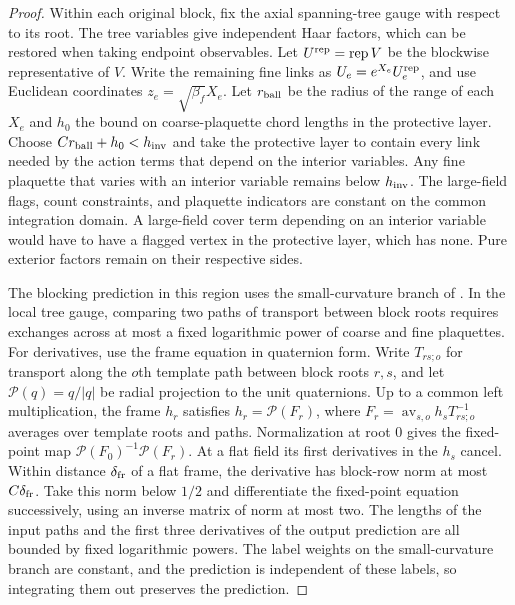 \documentclass[11pt,a4paper]{article}
\numberwithin{equation}{section}
\begin{document}
\begin{proof}
Within each original block, fix the axial spanning-tree gauge with respect to its root. The tree variables give independent Haar factors, which can be restored when taking endpoint observables. Let \(U^{\rm rep}=\operatorname{rep}V\) be the blockwise representative of \(V\). Write the remaining fine links as \(U_e=e^{X_e}U_e^{\rm rep}\), and use Euclidean coordinates \(z_e=\sqrt{\beta_f}X_e\). Let \(r_{\rm ball}\) be the radius of the range of each \(X_e\) and \(h_0\) the bound on coarse-plaquette chord lengths in the protective layer. Choose \(Cr_{\rm ball}+h_0<h_{\rm inv}\) and take the protective layer to contain every link needed by the action terms that depend on the interior variables. Any fine plaquette that varies with an interior variable remains below \(h_{\rm inv}\). The large-field flags, count constraints, and plaquette indicators are constant on the common integration domain. A large-field cover term depending on an interior variable would have to have a flagged vertex in the protective layer, which has none. Pure exterior factors remain on their respective sides.

The blocking prediction in this region uses the small-curvature branch of \cite[Definitions 11.2--11.3 and Lemma 11.4]{armstrong}. In the local tree gauge, comparing two paths of transport between block roots requires exchanges across at most a fixed logarithmic power of coarse and fine plaquettes. For derivatives, use the frame equation in quaternion form. Write \(T_{rs;o}\) for transport along the \(o\)th template path between block roots \(r,s\), and let \(\mathcal P(q)=q/|q|\) be radial projection to the unit quaternions. Up to a common left multiplication, the frame \(h_r\) satisfies \(h_r=\mathcal P(F_r)\), where \(F_r=\operatorname{av}_{s,o}h_sT_{rs;o}^{-1}\) averages over template roots and paths. Normalization at root \(0\) gives the fixed-point map \(\mathcal P(F_0)^{-1}\mathcal P(F_r)\). At a flat field its first derivatives in the \(h_s\) cancel. Within distance \(\delta_{\rm fr}\) of a flat frame, the derivative has block-row norm at most \(C\delta_{\rm fr}\). Take this norm below \(1/2\) and differentiate the fixed-point equation successively, using an inverse matrix of norm at most two. The lengths of the input paths and the first three derivatives of the output prediction are all bounded by fixed logarithmic powers. The label weights on the small-curvature branch are constant, and the prediction is independent of these labels, so integrating them out preserves the prediction.


\end{proof}
\end{document}
